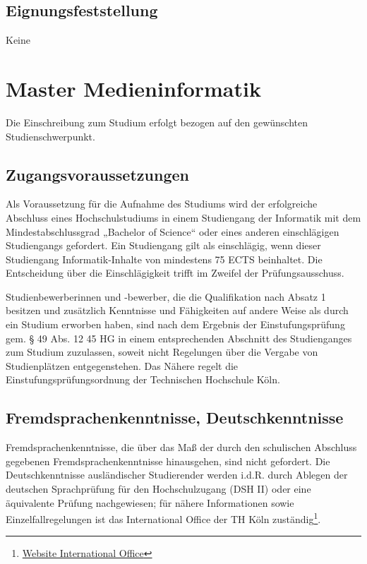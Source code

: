 \subsection{Eignungsfeststellung}\label{eignungsfeststellung}

Keine

\section{Master Medieninformatik}\label{master-medieninformatik-1}

Die Einschreibung zum Studium erfolgt bezogen auf den gewünschten
Studienschwerpunkt.

\subsection{Zugangsvoraussetzungen}\label{zugangsvoraussetzungen-1}

Als Voraussetzung für die Aufnahme des Studiums wird der erfolgreiche
Abschluss eines Hochschulstudiums in einem Studiengang der Informatik
mit dem Mindestabschlussgrad „Bachelor of Science`` oder eines anderen
einschlägigen Studiengangs gefordert. Ein Studiengang gilt als
einschlägig, wenn dieser Studiengang Informatik-Inhalte von mindestens
75 ECTS beinhaltet. Die Entscheidung über die Einschlägigkeit trifft im
Zweifel der Prüfungsausschuss.

Studienbewerberinnen und -bewerber, die die Qualifikation nach Absatz 1
besitzen und zusätzlich Kenntnisse und Fähigkeiten auf andere Weise als
durch ein Studium erworben haben, sind nach dem Ergebnis der
Einstufungsprüfung gem. § 49 Abs. 12 45 HG in einem entsprechenden
Abschnitt des Studienganges zum Studium zuzulassen, soweit nicht
Regelungen über die Vergabe von Studienplätzen entgegenstehen. Das
Nähere regelt die Einstufungsprüfungsordnung der Technischen Hochschule
Köln.

\subsection{Fremdsprachenkenntnisse,
Deutschkenntnisse}\label{fremdsprachenkenntnisse-deutschkenntnisse-1}

Fremdsprachenkenntnisse, die über das Maß der durch den schulischen
Abschluss gegebenen Fremdsprachenkenntnisse hinausgehen, sind nicht
gefordert. Die Deutschkenntnisse ausländischer Studierender werden
i.d.R. durch Ablegen der deutschen Sprachprüfung für den Hochschulzugang
(DSH II) oder eine äquivalente Prüfung nachgewiesen; für nähere
Informationen sowie Einzelfallregelungen ist das International Office
der TH Köln zuständig\footnote{\href{https://www.th-koeln.de/internationales/international-office_1986.php}{Website
  International Office}}.

